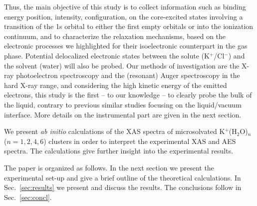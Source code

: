 Thus, the main objective of this study is to collect information such as binding energy position, intensity, configuration, on the core-excited states involving a transition of the 1s orbital to either the first empty orbitals or into the ionization continuum, and to characterize the relaxation mechanisms, based on the electronic processes we highlighted for their isoelectronic counterpart in the gas phase. Potential delocalized electronic states between the solute (K$^{+}$/Cl$^{-}$) and the solvent (water) will also be probed. Our methods of investigation are the X-ray photoelectron spectroscopy and the (resonant) Auger spectroscopy in the hard X-ray range, and considering the high kinetic energy of the emitted electrons, this study is the first – to our knowledge – to clearly probe the bulk of the liquid, contrary to previous similar studies focusing on the liquid/vacuum interface. More details on the instrumental part are given in the next section.


We present {\it ab initio} calculations of the XAS spectra of microsolvated K$^{+}$(H$_2$O)$_n$ ($n = 1, 2, 4, 6$) clusters in order to interpret the experimental XAS and AES spectra. The calculations give further insight into the experimental results.

The paper is organized as follows. In the next section we present the experimental set-up and give a brief outline of the theoretical calculations. In Sec.\ \ref{sec:results} we present and discuss the results. The conclusions follow in Sec.\ \ref{sec:concl}.